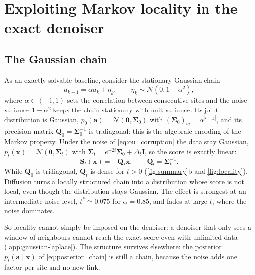 \documentclass{article}
\begin{document}
\section{Exploiting Markov locality in the exact denoiser}
\label{sec:exact}

\subsection{The Gaussian chain}
\label{sec:gaussian}

As an exactly solvable baseline, consider the stationary Gaussian chain
\begin{equation}
    a_{k+1}=\alpha a_k+\eta_k,
    \qquad \eta_k\sim\mathcal N(0,1-\alpha^2),
\end{equation}
where $\alpha\in(-1,1)$ sets the correlation between consecutive sites and the noise variance $1-\alpha^2$ keeps the
chain stationary with unit variance. Its joint distribution is Gaussian,
$p_0(\mathbf a)=\mathcal N(\mathbf 0,\boldsymbol\Sigma_0)$ with $(\boldsymbol\Sigma_0)_{ij}=\alpha^{|i-j|}$, and its
precision matrix $\mathbf Q_0=\boldsymbol\Sigma_0^{-1}$ is tridiagonal: this is the algebraic encoding of the Markov
property. Under the noise of \cref{eq:ou_corruption} the data stay Gaussian,
$p_t(\mathbf x)=\mathcal N(\mathbf 0,\boldsymbol\Sigma_t)$ with
$\boldsymbol\Sigma_t=e^{-2t}\boldsymbol\Sigma_0+\Delta_t\mathbf I$, so the score is exactly linear:
\begin{equation}
    \mathbf S_t(\mathbf x)
    =-\mathbf Q_t\mathbf x,
    \qquad \mathbf Q_t=\boldsymbol\Sigma_t^{-1}.
\end{equation}
While $\mathbf Q_0$ is tridiagonal, $\mathbf Q_t$ is dense for $t>0$ (\cref{fig:summary}b and \cref{fig:locality}). Diffusion turns a locally
structured chain into a distribution whose score is not local, even though the distribution stays Gaussian. The effect
is strongest at an intermediate noise level, $t^{*}\simeq0.075$ for $\alpha=0.85$, and fades at large $t$, where the
noise dominates.


So locality cannot simply be imposed on the denoiser: a denoiser that only sees a window of neighbours cannot reach the
exact score even with unlimited data (\cref{app:gaussian-laplace}). The structure survives elsewhere: the posterior
$p_t(\mathbf a\mid\mathbf x)$ of \cref{eq:posterior_chain} is still a chain, because the noise adds one factor per site
and no new link.
\end{document}
